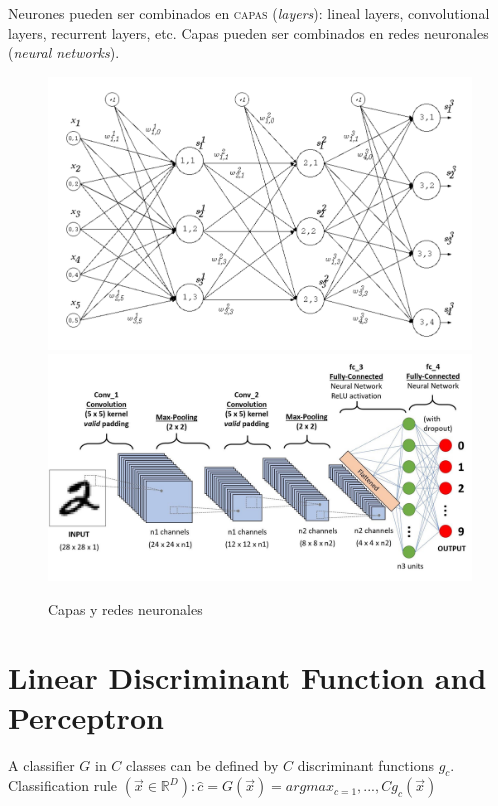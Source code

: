 Neurones pueden ser combinados en \textsc{capas} (\textit{layers}): lineal layers, convolutional layers, recurrent layers, etc.
Capas pueden ser combinados en redes neuronales (\textit{neural networks}).

\begin{figure}[htbp]
   \centering
   \includegraphics{images/08/layers1.png}
   \includegraphics{images/08/layers2.jpeg}
   \caption{Capas y redes neuronales}
   \label{fig:08/layers}
\end{figure}

\section{Linear Discriminant Function and Perceptron}

A classifier $G$ in $C$ classes can be defined by $C$ discriminant functions $g_c$.\\
Classification rule $(\vec{x} \in \mathbb{R}^D ): \hat{c} = G(\vec{x}) = arg max_{c=1},...,C g_c (\vec{x})$

